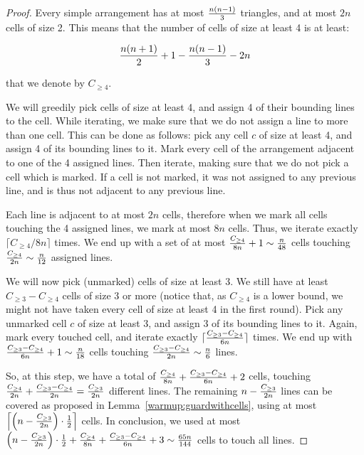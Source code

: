 \documentclass[11pt,a4paper]{article}
\begin{document}
\begin{proof}
Every simple arrangement has at most $n(n-1)\over 3$ triangles, and at most $2n$ cells of size 2. This means that the number of cells of size at least 4 is at least:

$${n (n+1) \over 2}+1 - {n(n-1)\over 3} - 2n$$

\noindent that we denote by $C_{\ge 4}$.

We will greedily pick cells of size at least 4, and assign 4 of their bounding lines to the cell. While iterating, we make sure that we do not assign a line to more than one cell. This can be done as follows: pick any cell $c$ of size at least 4, and assign 4 of its bounding lines to it. Mark every cell of the arrangement adjacent to one of the 4 assigned lines. Then iterate, making sure that we do not pick a cell which is marked. If a cell is not marked, it was not assigned to any previous line, and is thus not adjacent to any previous line.

Each line is adjacent to at most $2n$ cells, therefore when we mark all cells touching the 4 assigned lines, we mark at most $8n$ cells.
Thus, we iterate exactly $\lceil{ C_{\ge 4}/ 8n} \rceil$ times. We end up with a set of at most ${C_{\ge 4} \over 8n}+1 \sim {n \over 48}$ cells touching ${C_{\ge 4} \over 2n} \sim {n \over 12}$ assigned lines.

We will now pick (unmarked) cells of size at least 3. We still have at least $C_{\ge 3} -  C_{\ge 4} $ cells of size 3 or more (notice that, as $C_{\ge 4}$ is a lower bound, we might not have taken every cell of size at least 4 in the first round). Pick any unmarked cell $c$ of size at least 3, and assign 3 of its bounding lines to it. Again, mark every touched cell, and iterate exactly $\lceil{C_{\ge 3} -  C_{\ge 4} \over 6n}\rceil$ times. We end up with ${C_{\ge 3} -  C_{\ge 4} \over 6n}+1 \sim {n \over 18}$ cells touching $ {C_{\ge 3} -  C_{\ge 4} \over 2n} \sim {n \over 6}$ lines.

So, at this step, we have a total of ${C_{\ge 4} \over 8n}+ {C_{\ge 3} -  C_{\ge 4} \over 6n} +2$ cells, touching ${C_{\ge 4} \over 2n} + {C_{\ge 3} -  C_{\ge 4} \over 2n} = {C_{\ge 3} \over 2n}$ different lines. The remaining $n- {C_{\ge 3} \over 2n}$ lines can be covered as proposed in Lemma~\ref{warmup:guardwithcells}, using at most  $\left\lceil{\left(n- {C_{\ge 3} \over 2n}\right) \cdot {1\over 2}}\right\rceil$ cells. In conclusion, we used at most $\left(n- {C_{\ge 3} \over 2n}\right) \cdot {1\over 2} + {C_{\ge 4} \over 8n}+ {C_{\ge 3} -  C_{\ge 4} \over 6n} +3 \sim {65n \over 144}$ cells to touch all lines.
\end{proof}
\fi
\end{document}
